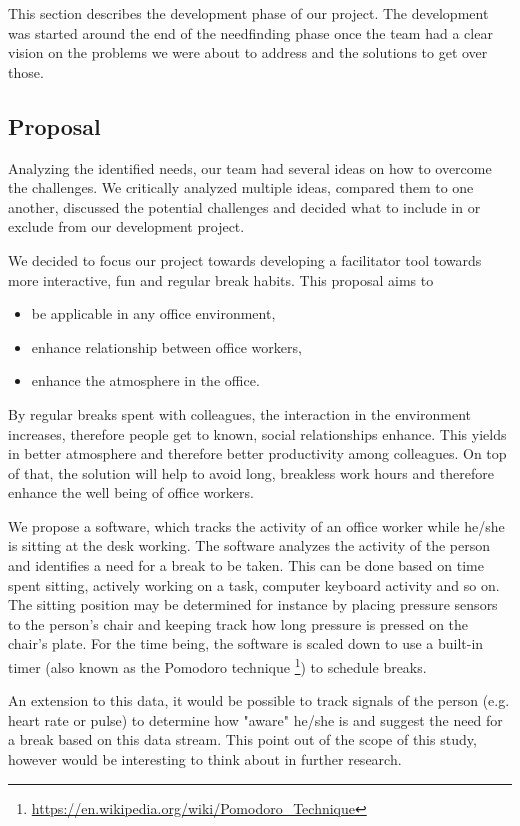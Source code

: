 This section describes the development phase of our project. The development was started around the end of the needfinding phase once the team had a clear vision on the problems we were about to address and the solutions to get over those.

\subsection{Proposal}
Analyzing the identified needs, our team had several ideas on how to overcome the challenges. We critically analyzed multiple ideas, compared them to one another, discussed the potential challenges and decided what to include in or exclude from our development project. 

We decided to focus our project towards developing a facilitator tool towards more interactive, fun and regular break habits. This proposal aims to 
\begin{itemize}
	\item be applicable in any office environment,
	\item enhance relationship between office workers,
 	\item enhance the atmosphere in the office.
\end{itemize}

By regular breaks spent with colleagues, the interaction in the environment increases, therefore people get to known, social relationships enhance. This yields in better atmosphere and therefore better productivity among colleagues. On top of that, the solution will help to avoid long, breakless work hours and therefore enhance the well being of office workers. 

We propose a software, which tracks the activity of an office worker while he/she is sitting at the desk working. The software analyzes the activity of the person and identifies a need for a break to be taken. This can be done based on time spent sitting, actively working on a task, computer keyboard activity and so on. The sitting position may be determined for instance by placing pressure sensors to the person's chair and keeping track how long pressure is pressed on the chair's plate. For the time being, the software is scaled down to use a built-in timer (also known as the Pomodoro technique \footnote{\url{https://en.wikipedia.org/wiki/Pomodoro_Technique}}) to schedule breaks. 

An extension to this data, it would be possible to track signals of the person (e.g. heart rate or pulse) to determine how "aware" he/she is and suggest the need for a break based on this data stream. This point out of the scope of this study, however would be interesting to think about in further research. 

